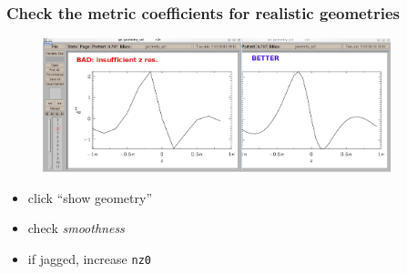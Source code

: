 \documentclass[10pt]{beamer}
\begin{document}

\begin{frame}
  \frametitle{Check the metric coefficients for realistic geometries}

\begin{figure}
\includegraphics[width=0.9\textwidth]{figs/geometry.jpg}
\end{figure}

\begin{block}{}
\begin{itemize}
 \item click ``show geometry''
 \item check {\em smoothness}
 \item if jagged, increase {\tt nz0}
\end{itemize}

\end{block}

\end{frame}

\end{document}

